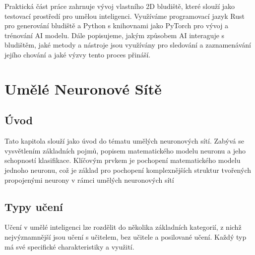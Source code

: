 \documentclass[12pt, a4paper,
twoside,        %
openright
]{report}
\begin{document}
Praktická část práce zahrnuje vývoj vlastního 2D bludiště, které slouží jako testovací prostředí pro umělou inteligenci. Využíváme programovací jazyk Rust pro generování bludiště a Python s knihovnami jako PyTorch pro vývoj a trénování AI modelu. Dále popisujeme, jakým způsobem AI interaguje s bludištěm, jaké metody a nástroje jsou využívány pro sledování a zaznamenávání jejího chování a jaké výzvy tento proces přináší.





\chapter{Umělé Neuronové Sítě}

\section{Úvod}
\label{sec:uvod}

Tato kapitola slouží jako úvod do tématu umělých neuronových sítí. Zabývá se vysvětlením základních pojmů, popisem matematického modelu neuronu a jeho schopností klasifikace. Klíčovým prvkem je pochopení matematického modelu jednoho neuronu, což je základ pro pochopení komplexnějších struktur tvořených propojenými neurony v rámci umělých neuronových sítí



\section{Typy učení}
\label{sec:prace_s_textem}
Učení v umělé inteligenci lze rozdělit do několika základních kategorií, z nichž nejvýznamnější jsou učení s učitelem, bez učitele a posilované učení. Každý typ má své specifické charakteristiky a využití.
\end{document}
